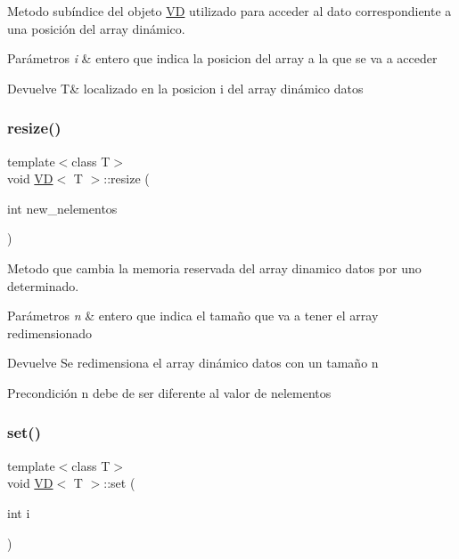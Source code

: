 Metodo subíndice del objeto \hyperlink{classVD}{VD} utilizado para acceder al dato correspondiente a una posición del array dinámico. 


\begin{DoxyParams}{Parámetros}
{\em i} & entero que indica la posicion del array a la que se va a acceder \\
\hline
\end{DoxyParams}
\begin{DoxyReturn}{Devuelve}
T\& localizado en la posicion i del array dinámico datos 
\end{DoxyReturn}
\mbox{\label{classVD_a473e1573994209fa70e955bc73b0e8c4}} 
\subsubsection{\texorpdfstring{resize()}{resize()}}
{\footnotesize\ttfamily template$<$class T$>$ \\
void \hyperlink{classVD}{VD}$<$ T $>$\+::resize (\begin{DoxyParamCaption}\item[{int}]{new\+\_\+nelementos }\end{DoxyParamCaption})\hspace{0.3cm}{\ttfamily [inline]}}



Metodo que cambia la memoria reservada del array dinamico datos por uno determinado. 


\begin{DoxyParams}{Parámetros}
{\em n} & entero que indica el tamaño que va a tener el array redimensionado \\
\hline
\end{DoxyParams}
\begin{DoxyReturn}{Devuelve}
Se redimensiona el array dinámico datos con un tamaño n 
\end{DoxyReturn}
\begin{DoxyPrecond}{Precondición}
n debe de ser diferente al valor de nelementos 
\end{DoxyPrecond}
\mbox{\label{classVD_ac6aea049465bd63188c8e66df39c6dd5}} 
\subsubsection{\texorpdfstring{set()}{set()}}
{\footnotesize\ttfamily template$<$class T$>$ \\
void \hyperlink{classVD}{VD}$<$ T $>$\+::set (\begin{DoxyParamCaption}\item[{int}]{i }\end{DoxyParamCaption})\hspace{0.3cm}{\ttfamily [inline]}}



